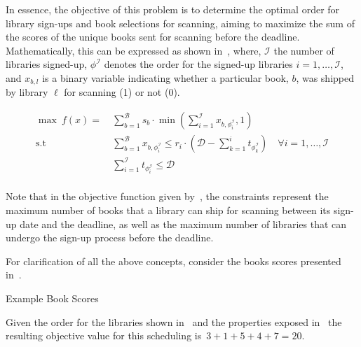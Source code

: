In essence, the objective of this problem is to determine the optimal order for
library sign-ups and book selections for scanning, aiming to maximize the sum of
the scores of the unique books sent for scanning before the deadline.
Mathematically, this can be expressed as shown in~, where,
$\mathcal{I}$ the number of libraries signed-up, $\phi^\mathcal{I}$ denotes the
order for the signed-up libraries $i = 1, \ldots, \mathcal{I}$, and $x_{b,l}$ is
a binary variable indicating whether a particular book, $b$, was shipped by
library $\ell$ for scanning (1) or not (0).

\begin{equation}
  \label{eq:bs-objective}
  \begin{aligned}
    \max\ f(x) =\  & \sum_{b = 1}^{\mathcal{B}}{s_{b} \cdot \min\left(\sum_{i = 1}^{\mathcal{I}}{x_{b, \phi_{i}^\mathcal{I}}} , 1\right)}                                                                     \\
    \text{s.t }    & \sum_{b = 1}^{\mathcal{B}}{x_{b, \phi_{i}^\mathcal{I}}} \leq r_{i} \cdot \left(\mathcal{D} - \sum_{k = 1}^{i}{t_{\phi_{k}^\mathcal{I}}} \right) \quad \forall i = 1, \ldots, \mathcal{I} \\
                   & \sum_{i = 1}^{\mathcal{I}}{t_{\phi_{i}^\mathcal{I}}} \leq \mathcal{D}                                                                                                                    \\
  \end{aligned}
\end{equation}

Note that in the objective function given by~, the
constraints represent the maximum number of books that a library can ship for
scanning between its sign-up date and the deadline, as well as the maximum
number of libraries that can undergo the sign-up process before the deadline.

For clarification of all the above concepts, consider the books scores presented
in~.

\begin{table}[ht]
  \centering
  
  \caption{Example Book Scores}
  \label{tab:bs-example}
\end{table}

Given the order for the libraries shown in~ and the
properties exposed in~ the resulting objective
value for this scheduling is~$3 + 1 + 5 + 4 + 7 = 20$.


